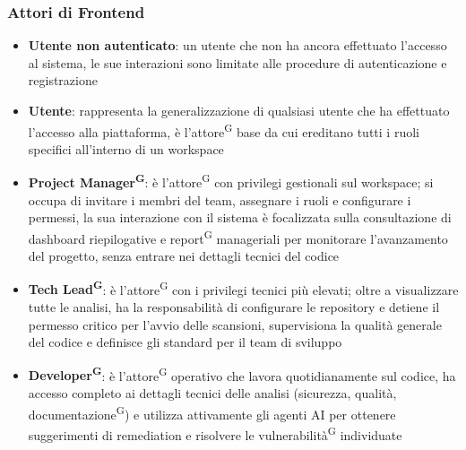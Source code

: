 \documentclass[a4paper, 11pt]{article}
\begin{document}
\subsubsection{Attori di Frontend}
\begin{itemize}
    	\item \textbf{Utente non autenticato}: un utente che non ha ancora effettuato l'accesso al sistema, le sue interazioni sono limitate alle procedure di autenticazione e registrazione
    
        \item \textbf{Utente}: rappresenta la generalizzazione di qualsiasi utente che ha effettuato l'accesso alla piattaforma, è l'attore\textsuperscript{G} base da cui ereditano tutti i ruoli specifici all'interno di un workspace
        
        \item \textbf{Project Manager\textsuperscript{G}}: è l'attore\textsuperscript{G} con privilegi gestionali sul workspace; si occupa di invitare i membri del team, assegnare i ruoli e configurare i permessi, la sua interazione con il sistema è focalizzata sulla consultazione di dashboard riepilogative e report\textsuperscript{G} manageriali per monitorare l'avanzamento del progetto, senza entrare nei dettagli tecnici del codice
        
        \item \textbf{Tech Lead\textsuperscript{G}}: è l'attore\textsuperscript{G} con i privilegi tecnici più elevati; oltre a visualizzare tutte le analisi, ha la responsabilità di configurare le repository e detiene il permesso critico per l'avvio delle scansioni, supervisiona la qualità generale del codice e definisce gli standard per il team di sviluppo
        
        \item \textbf{Developer\textsuperscript{G}}: è l'attore\textsuperscript{G} operativo che lavora quotidianamente sul codice, ha accesso completo ai dettagli tecnici delle analisi (sicurezza, qualità, documentazione\textsuperscript{G}) e utilizza attivamente gli agenti AI per ottenere suggerimenti di remediation e risolvere le vulnerabilità\textsuperscript{G} individuate
\end{itemize}
\end{document}
